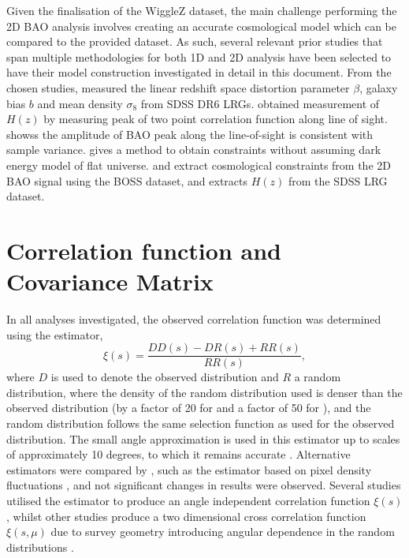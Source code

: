 \documentclass[titlesmallcaps, examinerscopy, copyrightpage]{uqthesis}
\begin{document}
Given the finalisation of the WiggleZ dataset, the main challenge performing the 2D BAO analysis involves creating an accurate cosmological model which can be compared to the provided dataset. As such, several relevant prior studies that span multiple methodologies for both 1D and 2D analysis have been selected to have their model construction investigated in detail in this document. From the chosen studies, \citet{CabreGaztanaga2009} measured the linear redshift space distortion parameter $\beta$, galaxy bias $b$ and mean density $\sigma_8$ from SDSS DR6 LRGs. \citet{Gaztanaga2009} obtained measurement of $H(z)$ by measuring peak of two point correlation function along line of sight. \citet{KazinBlanton2010} showss the amplitude of BAO peak along the line-of-sight is consistent with sample variance. \citet{ChuangWangHemantha2012} gives a method to obtain constraints without assuming dark energy model of flat universe. \citet{SanchezKazinBeutler2013} and \citet{Kazin2010} extract cosmological constraints from the 2D BAO signal using the BOSS dataset, and \citet{Gaztanaga2009} extracts $H(z)$ from the SDSS LRG dataset.


\section{Correlation function and Covariance Matrix}

In all analyses investigated, the observed correlation function was determined using the \citet{LandySzalay1993} estimator,
\begin{equation}
\xi(s) = \frac{DD(s) - DR(s) + RR(s)}{RR(s)},
\end{equation}
where $D$ is used to denote the observed distribution and $R$ a random distribution, where the density of the random distribution used is denser than the observed distribution (by a factor of 20 for \citet{Gaztanaga2009} and a factor of 50 for \citet{SanchezScoccola2012}), and the random distribution follows the same selection function as used for the observed distribution. The small angle approximation is used in this estimator up to scales of approximately 10 degrees, to which it remains accurate \citep{Szapudi2004, Matsubara2000Correlation}. Alternative estimators were compared by \citet{Gaztanaga2009}, such as the estimator based on pixel density fluctuations \citep{BarrigaGaztanaga2002}, and not significant changes in results were observed. Several studies utilised the \citet{LandySzalay1993} estimator to produce an angle independent correlation function $\xi(s)$ \citep{BlakeDavis2011, ChuangWang2012}, whilst other studies produce a two dimensional cross correlation function $\xi(s,\mu)$ due to survey geometry introducing angular dependence in the random distributions \citep{SanchezScoccola2012, SamushiaPercivalGuzzo2011, KazinSanchezBlanton2012}.
\end{document}
